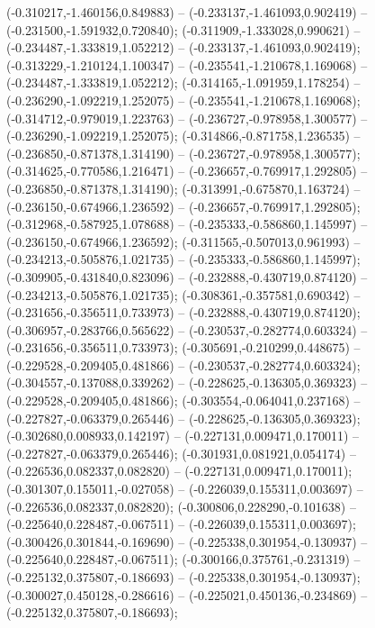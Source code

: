  (-0.310217,-1.460156,0.849883) -- (-0.233137,-1.461093,0.902419) -- (-0.231500,-1.591932,0.720840);
 (-0.311909,-1.333028,0.990621) -- (-0.234487,-1.333819,1.052212) -- (-0.233137,-1.461093,0.902419);
 (-0.313229,-1.210124,1.100347) -- (-0.235541,-1.210678,1.169068) -- (-0.234487,-1.333819,1.052212);
 (-0.314165,-1.091959,1.178254) -- (-0.236290,-1.092219,1.252075) -- (-0.235541,-1.210678,1.169068);
 (-0.314712,-0.979019,1.223763) -- (-0.236727,-0.978958,1.300577) -- (-0.236290,-1.092219,1.252075);
 (-0.314866,-0.871758,1.236535) -- (-0.236850,-0.871378,1.314190) -- (-0.236727,-0.978958,1.300577);
 (-0.314625,-0.770586,1.216471) -- (-0.236657,-0.769917,1.292805) -- (-0.236850,-0.871378,1.314190);
 (-0.313991,-0.675870,1.163724) -- (-0.236150,-0.674966,1.236592) -- (-0.236657,-0.769917,1.292805);
 (-0.312968,-0.587925,1.078688) -- (-0.235333,-0.586860,1.145997) -- (-0.236150,-0.674966,1.236592);
 (-0.311565,-0.507013,0.961993) -- (-0.234213,-0.505876,1.021735) -- (-0.235333,-0.586860,1.145997);
 (-0.309905,-0.431840,0.823096) -- (-0.232888,-0.430719,0.874120) -- (-0.234213,-0.505876,1.021735);
 (-0.308361,-0.357581,0.690342) -- (-0.231656,-0.356511,0.733973) -- (-0.232888,-0.430719,0.874120);
 (-0.306957,-0.283766,0.565622) -- (-0.230537,-0.282774,0.603324) -- (-0.231656,-0.356511,0.733973);
 (-0.305691,-0.210299,0.448675) -- (-0.229528,-0.209405,0.481866) -- (-0.230537,-0.282774,0.603324);
 (-0.304557,-0.137088,0.339262) -- (-0.228625,-0.136305,0.369323) -- (-0.229528,-0.209405,0.481866);
 (-0.303554,-0.064041,0.237168) -- (-0.227827,-0.063379,0.265446) -- (-0.228625,-0.136305,0.369323);
 (-0.302680,0.008933,0.142197) -- (-0.227131,0.009471,0.170011) -- (-0.227827,-0.063379,0.265446);
 (-0.301931,0.081921,0.054174) -- (-0.226536,0.082337,0.082820) -- (-0.227131,0.009471,0.170011);
 (-0.301307,0.155011,-0.027058) -- (-0.226039,0.155311,0.003697) -- (-0.226536,0.082337,0.082820);
 (-0.300806,0.228290,-0.101638) -- (-0.225640,0.228487,-0.067511) -- (-0.226039,0.155311,0.003697);
 (-0.300426,0.301844,-0.169690) -- (-0.225338,0.301954,-0.130937) -- (-0.225640,0.228487,-0.067511);
 (-0.300166,0.375761,-0.231319) -- (-0.225132,0.375807,-0.186693) -- (-0.225338,0.301954,-0.130937);
 (-0.300027,0.450128,-0.286616) -- (-0.225021,0.450136,-0.234869) -- (-0.225132,0.375807,-0.186693);
